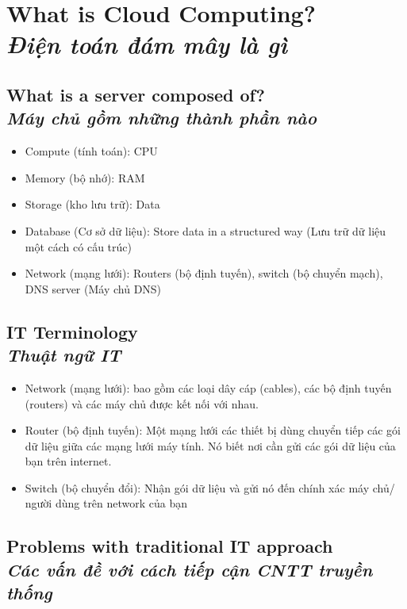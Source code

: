 \section[What is Cloud Computing?]{\textbf{What is Cloud Computing?} \\ \textit{Điện toán đám mây là gì}}



\subsection[What is a server composed of?]{\textbf{What is a server composed of?} \\
\textit{Máy chủ gồm những thành phần nào} }

\begin{itemize}
	\item Compute (tính toán): CPU
	\item Memory (bộ nhớ): RAM
	\item Storage (kho lưu trữ): Data
	\item Database (Cơ sở dữ liệu): Store data in a structured way (Lưu trữ dữ liệu một cách có cấu trúc)
	\item Network (mạng lưới): Routers (bộ định tuyến), switch (bộ chuyển mạch), DNS server (Máy chủ DNS)
\end{itemize}
\subsection[IT Terminology]{\textbf{IT Terminology} \\ \textit{Thuật ngữ IT}}

\begin{itemize}
	\item Network (mạng lưới): bao gồm các loại dây cáp (cables), các bộ định tuyến (routers) và các máy chủ được kết nối với nhau.
	\item Router (bộ định tuyến): Một mạng lưới các thiết bị dùng chuyển tiếp các gói dữ liệu giữa các mạng lưới máy tính. Nó biết nơi cần gửi các gói dữ liệu của bạn trên internet.
	\item Switch (bộ chuyển đổi): Nhận gói dữ liệu và gửi nó đến chính xác máy chủ/ người dùng trên network của bạn 
\end{itemize}

\subsection [Problems with traditional IT approach]{\textbf{Problems with traditional IT approach} \\ \textit{Các vấn đề với cách tiếp cận CNTT truyền thống}}

